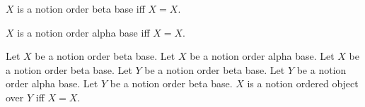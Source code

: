 \begin{definition}\label{notion_order_base_b}
    $X$ is a notion order beta base iff $X=X$.
\end{definition}

\begin{definition}\label{notion_order_base_a}
    $X$ is a notion order alpha base iff $X=X$.
\end{definition}

\begin{definition}\label{notion_ordered_object}
    Let $X$ be a notion order beta base.
    Let $X$ be a notion order alpha base.
    Let $X$ be a notion order beta base.
    Let $Y$ be a notion order beta base.
    Let $Y$ be a notion order alpha base.
    Let $Y$ be a notion order beta base.
    $X$ is a notion ordered object over $Y$ iff $X=X$.
\end{definition}
